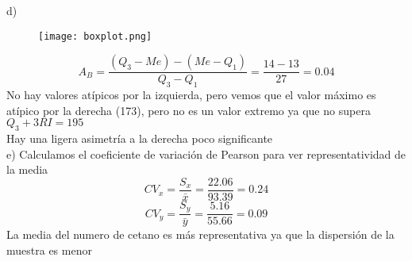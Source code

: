 \documentclass[fleqn]{article}
\begin{document}
	d)  
	\begin{figure}[H]
		\texttt{[image: boxplot.png]}
	\end{figure}
	\[
	A_B = \frac{(Q_3 - Me) - (Me - Q_1)}{Q_3-Q_1} = \frac{14-13}{27} = \boxed{0.04} 
	\]
	No hay valores atípicos por la izquierda, pero vemos que el valor máximo es atípico por la derecha (173), pero no es un valor extremo ya que no supera $Q_3 + 3RI = 195$ \\
	Hay una ligera asimetría a la derecha poco significante \\  
	e) Calculamos el coeficiente de variación de Pearson para ver representatividad de la media
	\[
	CV_x = \frac{S_x}{\bar{x}} = \frac{22.06}{93.39} = 0.24
	\] 
	\[
	CV_y = \frac{S_y}{\bar{y}} = \frac{5.16}{55.66} = 0.09
	\]
	La media del numero de cetano es más representativa ya que la dispersión de la muestra es menor
\end{document}
